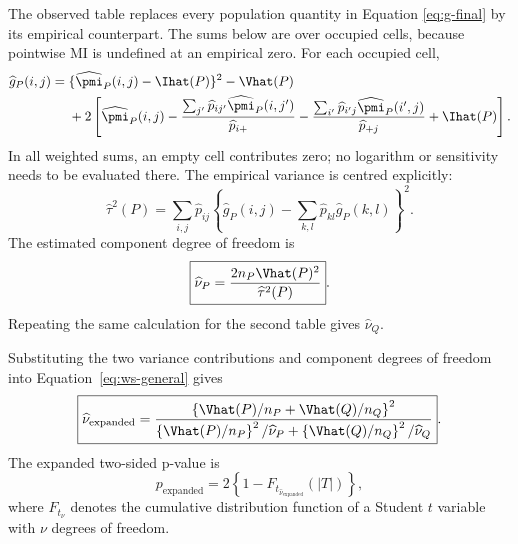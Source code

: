 \medskip
{}

The observed table replaces every population quantity in Equation
\eqref{eq:g-final} by its empirical counterpart. The sums below are over
occupied cells, because pointwise MI is undefined at an empirical zero. For
each occupied cell,
\begin{equation}
\begin{aligned}
\widehat g_P(i,j)
={}&\{\widehat\pmi_P(i,j)-\Ihat(P)\}^2-\Vhat(P)\\
&+2\left[
\widehat\pmi_P(i,j)
-\frac{\sum_{j'}\widehat p_{ij'}\widehat\pmi_P(i,j')}
       {\widehat p_{i+}}
-\frac{\sum_{i'}\widehat p_{i'j}\widehat\pmi_P(i',j)}
       {\widehat p_{+j}}
+\Ihat(P)
\right].
\end{aligned}
\label{eq:g-hat}
\end{equation}
In all weighted sums, an empty cell contributes zero; no logarithm or
sensitivity needs to be evaluated there. The empirical variance is centred
explicitly:
\begin{equation}
  \widehat\tau^2(P)
  =\sum_{i,j}\widehat p_{ij}
  \left\{\widehat g_P(i,j)
  -\sum_{k,l}\widehat p_{kl}\widehat g_P(k,l)\right\}^2.
  \label{eq:tau-hat}
\end{equation}
The estimated component degree of freedom is
\begin{equation}
  \boxed{
  \widehat\nu_P
  =\frac{2n_P\Vhat(P)^2}{\widehat\tau^2(P)}
  }.
  \label{eq:nu-p-hat}
\end{equation}
Repeating the same calculation for the second table gives
\(\widehat\nu_Q\).

\medskip
{}

Substituting the two variance contributions and component degrees of freedom
into Equation~\eqref{eq:ws-general} gives
\begin{equation}
  \boxed{
  \widehat\nu_{\mathrm{expanded}}
  =
  \frac{
  \left\{\Vhat(P)/n_P+\Vhat(Q)/n_Q\right\}^2
  }{
  \left\{\Vhat(P)/n_P\right\}^2/\widehat\nu_P
  +
  \left\{\Vhat(Q)/n_Q\right\}^2/\widehat\nu_Q
  }
  }.
  \label{eq:expanded-df}
\end{equation}
The expanded two-sided p-value is
\begin{equation}
  p_{\mathrm{expanded}}
  =2\left\{1-F_{t_{\widehat\nu_{\mathrm{expanded}}}}(|T|)\right\},
  \label{eq:expanded-p}
\end{equation}
where $F_{t_\nu}$ denotes the cumulative distribution function of a Student
$t$ variable with $\nu$ degrees of freedom.

